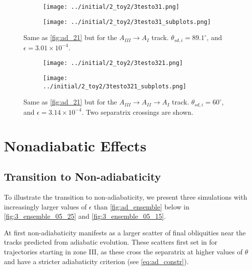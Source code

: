 \documentclass[
        fleqn,
        usenatbib,
    ]{mnras}
\begin{document}
\begin{figure}
    \centering
    \begin{subfigure}{\columnwidth}
        \centering
        \texttt{[image: ../initial/2\_toy2/3testo31.png]}
    \end{subfigure}
    \begin{subfigure}{\columnwidth}
        \centering
        \texttt{[image: ../initial/2\_toy2/3testo31\_subplots.png]}
    \end{subfigure}
    \caption{Same as \autoref{fig:ad_21} but for the $A_{III} \to A_I$
    track. $\theta_{sd, i} = 89.1^\circ$, and $\epsilon = 3.01 \times
    10^{-4}$.}\label{fig:ad_31}
\end{figure}
\begin{figure}
    \centering
    \begin{subfigure}{\columnwidth}
        \centering
        \texttt{[image: ../initial/2\_toy2/3testo321.png]}
    \end{subfigure}
    \begin{subfigure}{\columnwidth}
        \centering
        \texttt{[image: ../initial/2\_toy2/3testo321\_subplots.png]}
    \end{subfigure}
    \caption{Same as \autoref{fig:ad_21} but for the $A_{III} \to A_{II} \to A_I$
    track. $\theta_{sd, i} = 60^\circ$, and $\epsilon = 3.14 \times 10^{-4}$.
    Two separatrix crossings are shown.}\label{fig:ad_321}
\end{figure}

\section{Nonadiabatic Effects}\label{s:nonad}

\subsection{Transition to Non-adiabaticity}

To illustrate the transition to non-adiabaticity, we present three simulations
with increasingly larger values of $\epsilon$ than \autoref{fig:ad_ensemble}
below in \autoref{fig:3_ensemble_05_25} and \autoref{fig:3_ensemble_05_15}.

At first non-adiabaticity manifests as a larger scatter of final obliquities
near the tracks predicted from adiabatic evolution. These scatters first set in
for trajectories starting in zone III, as these cross the separatrix at higher
values of $\theta$ and have a stricter adiabaticity criterion (see
\autoref{eq:ad_constr}).
\end{document}
